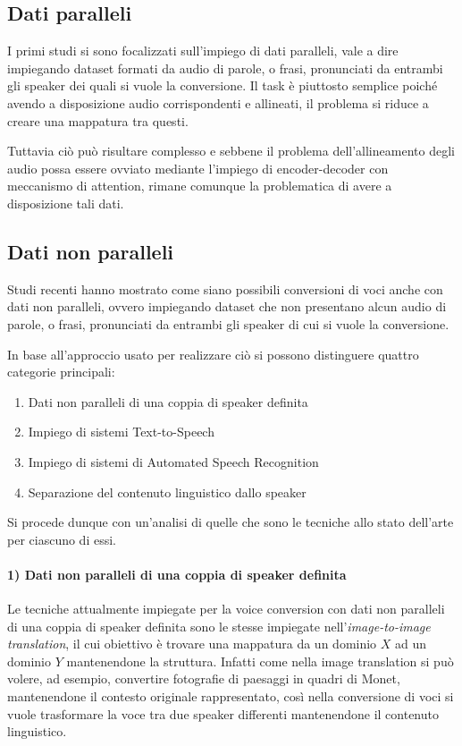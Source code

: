 			\subsection{Dati paralleli}
			I primi studi si sono focalizzati sull'impiego di dati paralleli, vale a dire impiegando dataset formati da audio di parole, o frasi, pronunciati da entrambi gli speaker dei quali si vuole la conversione. Il task è piuttosto semplice poiché avendo a disposizione audio corrispondenti e allineati, il problema si riduce a creare una mappatura tra questi.
			
			Tuttavia ciò può risultare complesso e sebbene il problema dell'allineamento degli audio possa essere ovviato mediante l'impiego di encoder-decoder con meccanismo di attention\cite{attention-mechanism}, rimane comunque la problematica di avere a disposizione tali dati.
			
			\subsection{Dati non paralleli}
			Studi recenti hanno mostrato come siano possibili conversioni di voci anche con dati non paralleli, ovvero impiegando dataset che non presentano alcun audio di parole, o frasi, pronunciati da entrambi gli speaker di cui si vuole la conversione.
			
			In base all'approccio usato per realizzare ciò si possono distinguere quattro categorie principali:
			\begin{enumerate}
				\item Dati non paralleli di una coppia di speaker definita
				\item Impiego di sistemi Text-to-Speech
				\item Impiego di sistemi di Automated Speech Recognition
				\item Separazione del contenuto linguistico dallo speaker
			\end{enumerate}
			Si procede dunque con un'analisi di quelle che sono le tecniche allo stato dell'arte per ciascuno di essi.
			
			\paragraph{1) Dati non paralleli di una coppia di speaker definita}
			Le tecniche attualmente impiegate per la voice conversion con dati non paralleli di una coppia di speaker definita sono le stesse impiegate nell'\textit{image-to-image translation}, il cui obiettivo è trovare una mappatura da un dominio $X$ ad un dominio $Y$ mantenendone la struttura.
			Infatti come nella image translation si può volere, ad esempio, convertire fotografie di paesaggi in quadri di Monet, mantenendone il contesto originale rappresentato, così nella conversione di voci si vuole trasformare la voce tra due speaker differenti mantenendone il contenuto linguistico.
			
